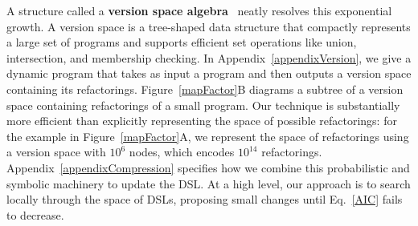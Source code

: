 \documentclass{article}
\newcommand{\code}[1]{{\footnotesize\texttt{#1}}}
\begin{document}
A structure called a \textbf{version space
  algebra}~\cite{lau2001programming,mitchell1977version,polozov2015flashmeta}
neatly resolves this exponential growth.  A version space is a
tree-shaped data structure that compactly represents a large set of
programs and supports efficient set operations like union,
intersection, and membership checking.  In
Appendix~\ref{appendixVersion}, we give a dynamic program that takes
as input a program and then outputs a version space containing its
refactorings. Figure~\ref{mapFactor}B diagrams a subtree of a
version space containing refactorings of a small program. Our
technique is substantially more efficient than explicitly representing
the space of possible refactorings: for the example in
Figure~\ref{mapFactor}A, we represent the space of refactorings using
a version space with $10^6$ nodes, which encodes $10^{14}$
refactorings. Appendix~\ref{appendixCompression} specifies how we combine this probabilistic and symbolic machinery to update the DSL.
At a high level, our approach is to search locally through the space 
of DSLs, proposing small changes until Eq.~\ref{AIC}
fails to decrease.  




\end{document}
